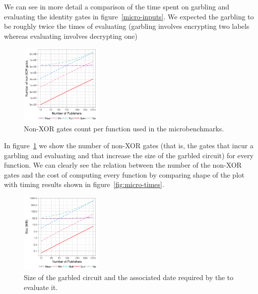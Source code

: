 We can see in more detail a comparison of the time spent on garbling and
evaluating the identity gates in figure~\ref{micro-inputs}.  We expected the
garbling to be roughly twice the times of evaluating (garbling involves
encrypting two labels whereas evaluating involves decrypting one)

\begin{figure}
  \includegraphics[width=0.35\textwidth]{plots/nonxor_gates_log.png}
  \caption{Non-XOR gates count per function used in the microbenchmarks.}
  \label{micro-nonxor}
\end{figure}

In figure~\ref{micro-nonxor} we show the number of non-XOR gates (that is, the gates that
incur a garbling and evaluating and that increase the size of the garbled
circuit) for every function.  We can clearly see the relation between the
number of the non-XOR gates and the cost of computing every function by
comparing shape of the plot with timing results shown in
figure~\ref{fig:micro-times}.

\begin{figure}
  \includegraphics[width=0.35\textwidth]{plots/size_log.png}
  \caption{Size of the garbled circuit and the associated date required by the
    \broker to evaluate it.}
  \label{micro-sizes}
\end{figure}

